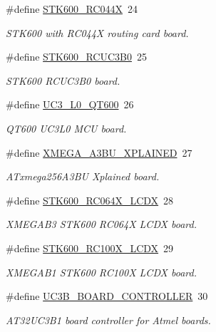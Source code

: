 \begin{DoxyCompactItemize}
\#define \mbox{\hyperlink{group__group__common__boards_ga53054d452a89f550fcdff65adc167f88}{S\+T\+K600\+\_\+\+R\+C044X}}~24
\begin{DoxyCompactList}\small\item\em S\+T\+K600 with R\+C044X routing card board. \end{DoxyCompactList}\item 
\#define \mbox{\hyperlink{group__group__common__boards_ga6bdfe50597188fd8a4956c247ecf9fa9}{S\+T\+K600\+\_\+\+R\+C\+U\+C3\+B0}}~25
\begin{DoxyCompactList}\small\item\em S\+T\+K600 R\+C\+U\+C3\+B0 board. \end{DoxyCompactList}\item 
\#define \mbox{\hyperlink{group__group__common__boards_gae06980d7c2c8a89eab699394bfb52897}{U\+C3\+\_\+\+L0\+\_\+\+Q\+T600}}~26
\begin{DoxyCompactList}\small\item\em Q\+T600 U\+C3\+L0 M\+CU board. \end{DoxyCompactList}\item 
\#define \mbox{\hyperlink{group__group__common__boards_ga6bc10dae84bde15597ba87e803e6f476}{X\+M\+E\+G\+A\+\_\+\+A3\+B\+U\+\_\+\+X\+P\+L\+A\+I\+N\+ED}}~27
\begin{DoxyCompactList}\small\item\em A\+Txmega256\+A3\+BU Xplained board. \end{DoxyCompactList}\item 
\#define \mbox{\hyperlink{group__group__common__boards_gae7749288a3bd2be20b0283233af4df79}{S\+T\+K600\+\_\+\+R\+C064\+X\+\_\+\+L\+C\+DX}}~28
\begin{DoxyCompactList}\small\item\em X\+M\+E\+G\+A\+B3 S\+T\+K600 R\+C064X L\+C\+DX board. \end{DoxyCompactList}\item 
\#define \mbox{\hyperlink{group__group__common__boards_gab6b4267fd4d74fbb8cf083764addfdc8}{S\+T\+K600\+\_\+\+R\+C100\+X\+\_\+\+L\+C\+DX}}~29
\begin{DoxyCompactList}\small\item\em X\+M\+E\+G\+A\+B1 S\+T\+K600 R\+C100X L\+C\+DX board. \end{DoxyCompactList}\item 
\#define \mbox{\hyperlink{group__group__common__boards_ga79a559c8d51d9370af4f37c36b6e7d58}{U\+C3\+B\+\_\+\+B\+O\+A\+R\+D\+\_\+\+C\+O\+N\+T\+R\+O\+L\+L\+ER}}~30
\begin{DoxyCompactList}\small\item\em A\+T32\+U\+C3\+B1 board controller for Atmel boards. \end{DoxyCompactList}\item 

\end{DoxyCompactItemize}
